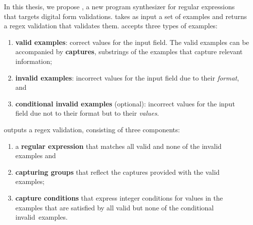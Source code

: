 In this thesis, we propose \Forest{}, a new program synthesizer for regular expressions that targets digital form validations.
\Forest takes as input a set of examples and returns a regex validation that validates them.
\Forest accepts three types of examples:
\begin{enumerate}%
    \item \textbf{valid examples}: correct values for the input field. The valid examples can be accompanied by \textbf{captures}, substrings of the examples that capture relevant information;
    \item \textbf{invalid examples}: incorrect values for the input field due to their \textit{format}, and
    \item \textbf{conditional invalid examples} (optional): incorrect values for the input field due not to their format but to their \textit{values}.
\end{enumerate}
%
\Forest outputs a regex validation, consisting of three components:
\begin{enumerate}%
    \item a \textbf{regular expression} that matches all valid and none of the invalid examples and
    \item \textbf{capturing groups} that reflect the captures provided with the valid examples;
    \item \textbf{capture conditions} that express integer conditions for values in the examples that are satisfied by all valid but none of the conditional invalid~examples.
\end{enumerate}

